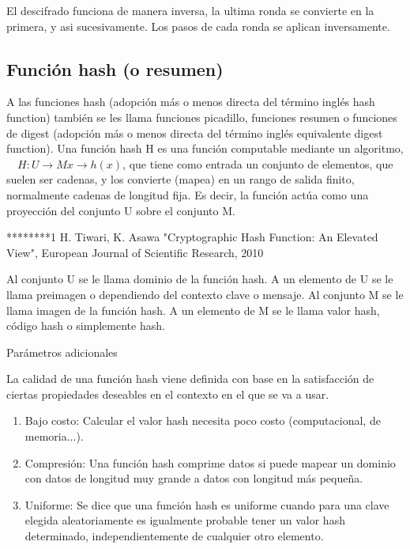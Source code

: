 \documentclass[spanish]{article}
\begin{document}
El descifrado funciona de manera inversa, la ultima ronda se convierte  en la primera, y asi sucesivamente. Los pasos de cada ronda se aplican inversamente.


\subsection{Función hash (o resumen)}
A las funciones hash (adopción más o menos directa del término inglés hash function) también se les llama funciones picadillo, funciones resumen o funciones de digest (adopción más o menos directa del término inglés equivalente digest function). Una función hash H es una función computable mediante un algoritmo,
 $H: U → M
 x → h(x)$,
que tiene como entrada un conjunto de elementos, que suelen ser cadenas, y los convierte (mapea) en un rango de salida finito, normalmente cadenas de longitud fija. Es decir, la función actúa como una proyección del conjunto U sobre el conjunto M.

********1 H. Tiwari, K. Asawa "Cryptographic Hash Function: An Elevated View", European Journal of Scientific Research, 2010


Al conjunto U se le llama dominio de la función hash. A un elemento de U se le llama preimagen o dependiendo del contexto clave o mensaje.
Al conjunto M se le llama imagen de la función hash. A un elemento de M se le llama valor hash, código hash o simplemente hash.

Parámetros adicionales

La calidad de una función hash viene definida con base en la satisfacción de ciertas propiedades deseables en el contexto en el que se va a usar.

\begin{enumerate}
\item Bajo costo: Calcular el valor hash necesita poco costo (computacional, de memoria...). 
\item Compresión: Una función hash comprime datos si puede mapear un dominio con datos de longitud muy grande a datos con longitud más pequeña.
\item Uniforme: Se dice que una función hash es uniforme cuando para una clave elegida aleatoriamente es igualmente probable tener un valor hash determinado, independientemente de cualquier otro elemento.
\end{enumerate}
\end{document}
